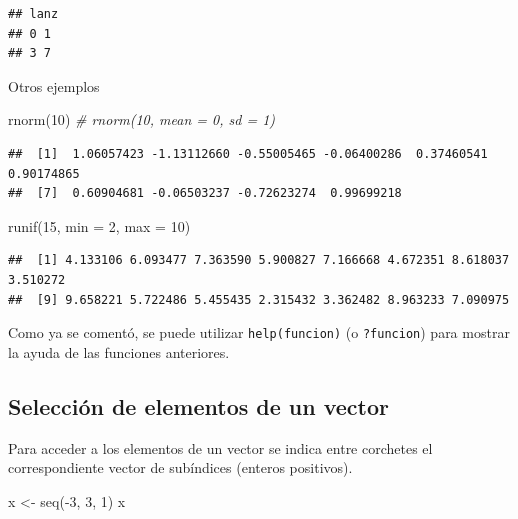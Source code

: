\documentclass[
]{book}
\newenvironment{Shaded}{\begin{snugshade}}{\end{snugshade}}
\newcommand{\AttributeTok}[1]{\textcolor[rgb]{0.77,0.63,0.00}{#1}}
\newcommand{\CommentTok}[1]{\textcolor[rgb]{0.56,0.35,0.01}{\textit{#1}}}
\newcommand{\DecValTok}[1]{\textcolor[rgb]{0.00,0.00,0.81}{#1}}
\newcommand{\FunctionTok}[1]{\textcolor[rgb]{0.00,0.00,0.00}{#1}}
\newcommand{\NormalTok}[1]{#1}
\newcommand{\OtherTok}[1]{\textcolor[rgb]{0.56,0.35,0.01}{#1}}
\newcommand{\SpecialCharTok}[1]{\textcolor[rgb]{0.00,0.00,0.00}{#1}}
\theoremstyle{break}
\theoremstyle{nonumberplain}
\begin{document}
\begin{verbatim}
## lanz
## 0 1 
## 3 7
\end{verbatim}

Otros ejemplos

\begin{Shaded}
\begin{Highlighting}[]
\FunctionTok{rnorm}\NormalTok{(}\DecValTok{10}\NormalTok{)  }\CommentTok{\# rnorm(10, mean = 0, sd = 1)}
\end{Highlighting}
\end{Shaded}

\begin{verbatim}
##  [1]  1.06057423 -1.13112660 -0.55005465 -0.06400286  0.37460541  0.90174865
##  [7]  0.60904681 -0.06503237 -0.72623274  0.99699218
\end{verbatim}

\begin{Shaded}
\begin{Highlighting}[]
\FunctionTok{runif}\NormalTok{(}\DecValTok{15}\NormalTok{, }\AttributeTok{min =} \DecValTok{2}\NormalTok{, }\AttributeTok{max =} \DecValTok{10}\NormalTok{)}
\end{Highlighting}
\end{Shaded}

\begin{verbatim}
##  [1] 4.133106 6.093477 7.363590 5.900827 7.166668 4.672351 8.618037 3.510272
##  [9] 9.658221 5.722486 5.455435 2.315432 3.362482 8.963233 7.090975
\end{verbatim}

Como ya se comentó, se puede utilizar \texttt{help(funcion)} (o \texttt{?funcion}) para mostrar la ayuda de las funciones anteriores.

\hypertarget{selecciuxf3n-de-elementos-de-un-vector}{%
\subsection{Selección de elementos de un vector}\label{selecciuxf3n-de-elementos-de-un-vector}}

Para acceder a los elementos de un vector se indica entre corchetes el
correspondiente vector de subíndices (enteros positivos).

\begin{Shaded}
\begin{Highlighting}[]
\NormalTok{x }\OtherTok{\textless{}{-}} \FunctionTok{seq}\NormalTok{(}\SpecialCharTok{{-}}\DecValTok{3}\NormalTok{, }\DecValTok{3}\NormalTok{, }\DecValTok{1}\NormalTok{)}
\NormalTok{x}
\end{Highlighting}
\end{Shaded}
\end{document}
